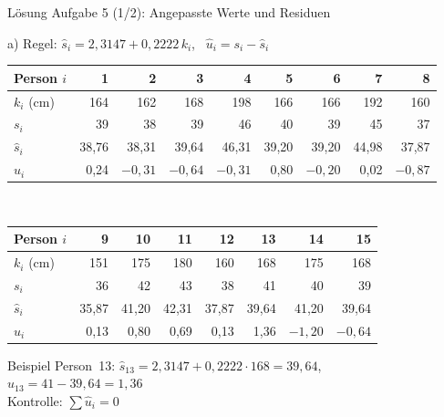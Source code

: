 \documentclass[aspectratio=169,11pt]{beamer}
\begin{document}
\begin{frame}{Lösung Aufgabe 5 (1/2): Angepasste Werte und Residuen}
  \begin{block}{a) Regel: $\hat{s}_i = 2{,}3147 + 0{,}2222\,k_i$, \ $\hat{u}_i = s_i - \hat{s}_i$}
    \begin{center}
      \footnotesize
      \renewcommand{\arraystretch}{1.0}
      \begin{tabular}{l*{8}{r}}
        \toprule
        Person $i$  & 1 & 2 & 3 & 4 & 5 & 6 & 7 & 8 \\
        \midrule
        $k_i$ (cm)  & 164 & 162 & 168 & 198 & 166 & 166 & 192 & 160 \\
        $s_i$       & 39 & 38 & 39 & 46 & 40 & 39 & 45 & 37 \\
        $\hat{s}_i$ & 38,76 & 38,31 & 39,64 & 46,31 & 39,20 & 39,20 & 44,98 & 37,87 \\
        $\hat{u}_i$ & 0,24 & $-0{,}31$ & $-0{,}64$ & $-0{,}31$ & 0,80 & $-0{,}20$ & 0,02 & $-0{,}87$ \\
        \bottomrule
      \end{tabular}\\[3pt]
      \begin{tabular}{l*{7}{r}}
        \toprule
        Person $i$  & 9 & 10 & 11 & 12 & 13 & 14 & 15 \\
        \midrule
        $k_i$ (cm)  & 151 & 175 & 180 & 160 & 168 & 175 & 168 \\
        $s_i$       & 36 & 42 & 43 & 38 & 41 & 40 & 39 \\
        $\hat{s}_i$ & 35,87 & 41,20 & 42,31 & 37,87 & 39,64 & 41,20 & 39,64 \\
        $\hat{u}_i$ & 0,13 & 0,80 & 0,69 & 0,13 & 1,36 & $-1{,}20$ & $-0{,}64$ \\
        \bottomrule
      \end{tabular}
    \end{center}
    \vspace{-4pt}
    \small Beispiel Person~13: $\hat{s}_{13} = 2{,}3147 + 0{,}2222 \cdot 168 = 39{,}64$,
    \ $\hat{u}_{13} = 41 - 39{,}64 = 1{,}36$\\ Kontrolle: $\sum \hat{u}_i = 0$ \checkmark
  \end{block}
\end{frame}
\end{document}
